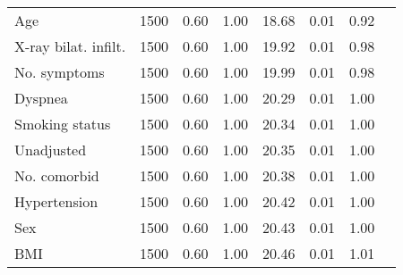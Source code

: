 \documentclass{article}
\begin{document}
{\begin{longtable}{lccccccc}
Age & 1500 & 0.60 & 1.00 &  18.68 &  0.01 & 0.92 \\ 
X-ray bilat. infilt. & 1500 & 0.60 & 1.00 &  19.92 &  0.01 & 0.98 \\ 
No. symptoms & 1500 & 0.60 & 1.00 &  19.99 &  0.01 & 0.98 \\ 
Dyspnea & 1500 & 0.60 & 1.00 &  20.29 &  0.01 & 1.00 \\ 
Smoking status & 1500 & 0.60 & 1.00 &  20.34 &  0.01 & 1.00 \\ 
Unadjusted & 1500 & 0.60 & 1.00 &  20.35 &  0.01 & 1.00 \\ 
No. comorbid & 1500 & 0.60 & 1.00 &  20.38 &  0.01 & 1.00 \\ 
Hypertension & 1500 & 0.60 & 1.00 &  20.42 &  0.01 & 1.00 \\ 
Sex & 1500 & 0.60 & 1.00 &  20.43 &  0.01 & 1.00 \\ 
BMI & 1500 & 0.60 & 1.00 &  20.46 &  0.01 & 1.01 \\
\bottomrule
\hline
\end{longtable}
}

\clearpage
\end{document}
